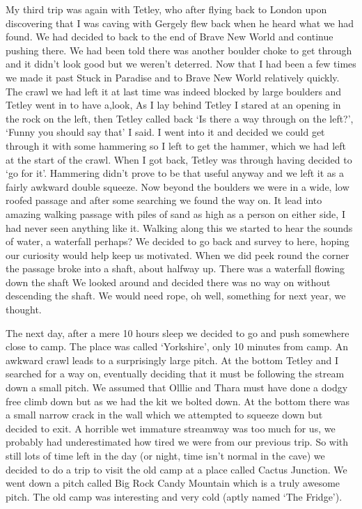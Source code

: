My third trip was again with Tetley, who after flying back to London upon discovering that I was caving with Gergely flew back when he heard what we had found. We had decided to back to the end of Brave New World and continue pushing there. We had been told there was another boulder choke to get through and it didn’t look good but we weren’t deterred. Now that I had been a few times we made it past Stuck in Paradise and to Brave New World relatively quickly. The crawl we had left it at last time was indeed blocked by large boulders and Tetley went in to have a,look, As I lay behind Tetley I stared at an opening in the rock on the left, then Tetley called back ‘Is there a way through on the left?’, ‘Funny you should say that’ I said. I went into it and decided we could get through it with some hammering so I left to get the hammer, which we had left at the start of the crawl. When I got back, Tetley was through having decided to ‘go for it’. Hammering didn’t prove to be that useful anyway and we left it as a fairly awkward double squeeze. Now beyond the boulders we were in a wide, low roofed passage and after some searching we found the way on. It lead into amazing walking passage with piles of sand as high as a person on either side, I had never seen anything like it. Walking along this we started to hear the sounds of water, a waterfall perhaps? We decided to go back and survey to here, hoping our curiosity would help keep us motivated. When we did peek round the corner the passage broke into a shaft, about halfway up. There was a waterfall flowing down the shaft We looked around and decided there was no way on without descending the shaft. We would need rope, oh well, something for next year, we thought.

The next day, after a mere 10 hours sleep we decided to go and push somewhere close to camp. The place was called ‘Yorkshire’, only 10 minutes from camp. An awkward crawl leads to a surprisingly large pitch. At the bottom Tetley and I searched for a way on, eventually deciding that it must be following the stream down a small pitch. We assumed that Olllie and Thara must have done a dodgy free climb down but as we had the kit we bolted down. At the bottom there was a small narrow crack in the wall which we attempted to squeeze down but decided to exit. A horrible wet immature streamway was too much for us, we probably had underestimated how tired we were from our previous trip. So with still lots of time left in the day (or night, time isn’t normal in the cave) we decided to do a trip to visit the old camp at a place called Cactus Junction. We went down a pitch called Big Rock Candy Mountain which is a truly awesome pitch. The old camp was interesting and very cold (aptly named ‘The Fridge’).

